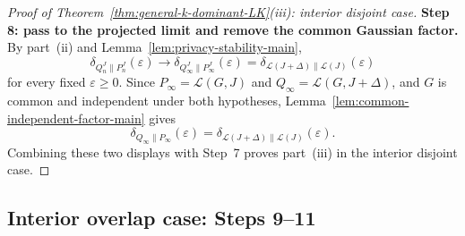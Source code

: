 \documentclass{article}
\newcommand{\1}{\mathbf 1}
\begin{document}
\begin{proof}[Proof of Theorem~\ref{thm:general-k-dominant-LK}(iii): interior disjoint case]
\medskip
\textbf{Step 8: pass to the projected limit and remove the common Gaussian factor.}
By part~(ii) and Lemma~\ref{lem:privacy-stability-main},
\[
\delta_{Q_n^J\|P_n^J}(\varepsilon)\to \delta_{Q_\infty^J\|P_\infty^J}(\varepsilon)
=\delta_{\mathcal L(J+\Delta)\|\mathcal L(J)}(\varepsilon)
\]
for every fixed $\varepsilon\ge 0$. Since $P_\infty=\mathcal L(G,J)$ and $Q_\infty=\mathcal L(G,J+\Delta)$, and $G$ is
common and independent under both hypotheses, Lemma~\ref{lem:common-independent-factor-main} gives
\[
\delta_{Q_\infty\|P_\infty}(\varepsilon)
=
\delta_{\mathcal L(J+\Delta)\|\mathcal L(J)}(\varepsilon).
\]
Combining these two displays with Step~7 proves part~(iii) in the interior disjoint case.
\end{proof}

\subsection*{Interior overlap case: Steps 9--11}
\end{document}
